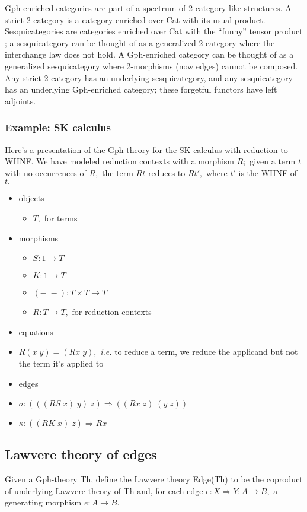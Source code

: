 \documentclass[a4paper,UKenglish]{article}
\newcommand{\maps}{\colon}
\begin{document}
Gph-enriched categories are part of a spectrum of 2-category-like structures.  A strict 2-category is a category enriched over Cat with its usual product.  Sesquicategories are categories enriched over Cat with the ``funny'' tensor product \cite{Lack2010}; a sesquicategory can be thought of as a generalized 2-category where the interchange law does not hold.  A Gph-enriched category can be thought of as a generalized sesquicategory where 2-morphisms (now edges) cannot be composed.  Any strict 2-category has an underlying sesquicategory, and any sesquicategory has an underlying Gph-enriched category; these forgetful functors have left adjoints.

\subsubsection{Example: SK calculus}
\label{skexample}
Here's a presentation of the Gph-theory for the SK calculus with reduction to WHNF.  We have modeled reduction contexts with a morphism $R;$ given a term $t$ with no occurrences of $R,$ the term $Rt$ reduces to $Rt',$ where $t'$ is the WHNF of $t.$ 

\begin{itemize}
  \item objects
    \begin{itemize}
      \item $T,$ for terms
    \end{itemize}
  \item morphisms
    \begin{itemize}
      \item $S\maps 1 \to T$
      \item $K\maps 1 \to T$
      \item $(-\; -)\maps T \times T \to T$
      \item $R\maps T \to T,$ for reduction contexts
    \end{itemize}
  \item equations
    \item $R(x\; y) = (Rx\; y),$ {\em i.e.} to reduce a term, we reduce the applicand but not the term it's applied to
  \item edges
    \item $\sigma\maps (((RS\; x)\; y)\; z) \Rightarrow ((Rx\; z)\; (y\; z))$
    \item $\kappa\maps ((RK\; x)\; z) \Rightarrow Rx$
\end{itemize}

\subsection{Lawvere theory of edges}
Given a Gph-theory Th, define the Lawvere theory Edge(Th) to be the coproduct of underlying Lawvere theory of Th and, for each edge $e\maps X \Rightarrow Y \maps A \to B,$ a generating morphism $e\maps A \to B.$
\end{document}
